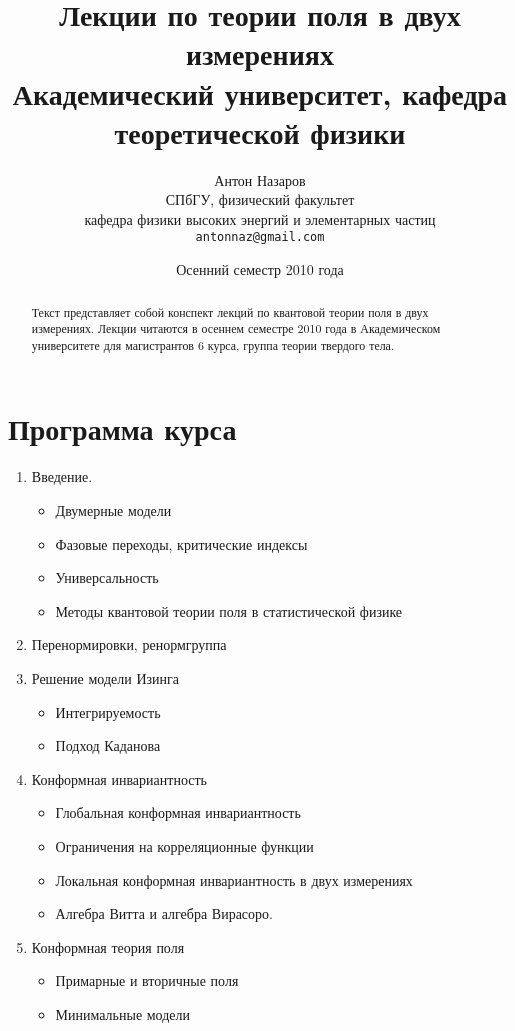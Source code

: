 \documentclass[a4paper,12pt]{article}
\title{Лекции по теории поля в двух измерениях\\
\small{Академический университет, кафедра теоретической физики}
}
\author{Антон Назаров\\
  \small{СПбГУ, физический факультет}\\
  \small{кафедра физики высоких энергий и элементарных частиц}\\
  \texttt{antonnaz@gmail.com}
}
\date{Осенний семестр 2010 года}
\theoremstyle{definition}
\theoremstyle{definition}
\theoremstyle{definition}
\begin{document}
\maketitle
\thispagestyle{empty}
\begin{abstract}
  Текст представляет собой конспект лекций по квантовой теории поля в двух измерениях. Лекции читаются в осеннем семестре 2010 года в Академическом университете для магистрантов 6 курса, группа теории твердого тела. 
\end{abstract}
\tableofcontents
\section{Программа курса}
\label{sec:program}
\begin{enumerate}
\item Введение.
  \begin{itemize}
  \item Двумерные модели
  \item Фазовые переходы, критические индексы
  \item Универсальность
  \item Методы квантовой теории поля в статистической физике
  \end{itemize}
\item Перенормировки, ренормгруппа
\item Решение модели Изинга
  \begin{itemize}
  \item Интегрируемость
  \item Подход Каданова
  \end{itemize}
\item Конформная инвариантность
  \begin{itemize}
  \item Глобальная конформная инвариантность
  \item Ограничения на корреляционные функции
  \item Локальная конформная инвариантность в двух измерениях
  \item Алгебра Витта и алгебра Вирасоро.
  \end{itemize}
\item Конформная теория поля
  \begin{itemize}
  \item Примарные и вторичные поля
  \item Минимальные модели
  \end{itemize}
\end{enumerate}
\end{document}
